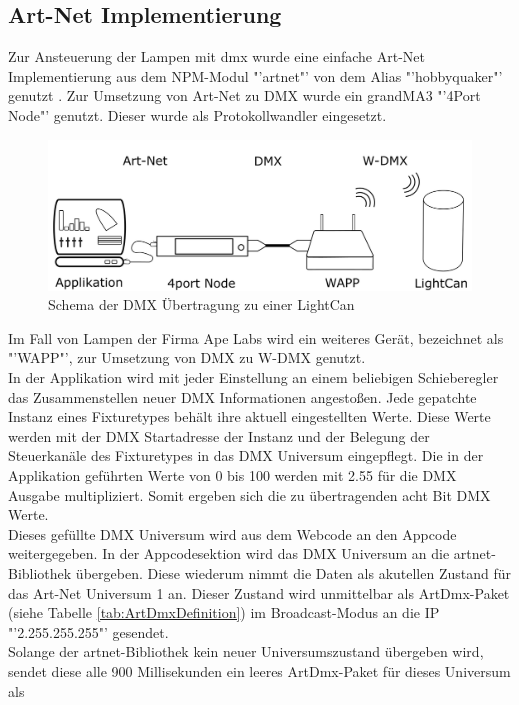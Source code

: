 \documentclass[11pt]{scrartcl}
\begin{document}
\subsection{Art-Net Implementierung}
Zur Ansteuerung der Lampen mit \ac{dmx} wurde eine einfache Art-Net Implementierung aus dem NPM-Modul "'artnet"' von dem Alias "'hobbyquaker"' genutzt
\cite{artnetPackage}. Zur Umsetzung von Art-Net zu DMX wurde ein grandMA3 "'4Port Node"' genutzt. Dieser wurde als Protokollwandler eingesetzt.\\
\begin{figure}[H]
    \begin{center}
        \includegraphics[width=.9\textwidth]{images/Data_transmission_scheme.png}
    \end{center}
    \caption{Schema der DMX Übertragung zu einer LightCan}\label{fig:dataScheme}
\end{figure}
\noindent
Im Fall von Lampen der Firma Ape Labs wird ein weiteres Gerät, bezeichnet als "'WAPP"', zur Umsetzung von DMX zu W-DMX genutzt.\\
In der Applikation wird mit jeder Einstellung an einem beliebigen Schieberegler das Zusammenstellen neuer DMX Informationen angestoßen. Jede gepatchte
Instanz eines Fixturetypes behält ihre aktuell eingestellten Werte. Diese Werte werden mit der DMX Startadresse der Instanz und der Belegung der Steuerkanäle
des Fixturetypes in das DMX Universum eingepflegt. Die in der Applikation geführten Werte von 0 bis 100 werden mit 2.55 für die DMX Ausgabe multipliziert. Somit
ergeben sich die zu übertragenden acht Bit DMX Werte.\\
Dieses gefüllte DMX Universum wird aus dem Webcode an den Appcode weitergegeben. In der Appcodesektion wird das DMX Universum an die artnet-Bibliothek übergeben.
Diese wiederum nimmt die Daten als akutellen Zustand für das Art-Net Universum 1 an. Dieser Zustand wird unmittelbar als ArtDmx-Paket (siehe Tabelle
\ref{tab:ArtDmxDefinition}) im Broadcast-Modus an die IP "'2.255.255.255"' gesendet.\\
Solange der artnet-Bibliothek kein neuer Universumszustand übergeben wird, sendet diese alle 900 Millisekunden ein leeres ArtDmx-Paket für dieses Universum als
\end{document}
